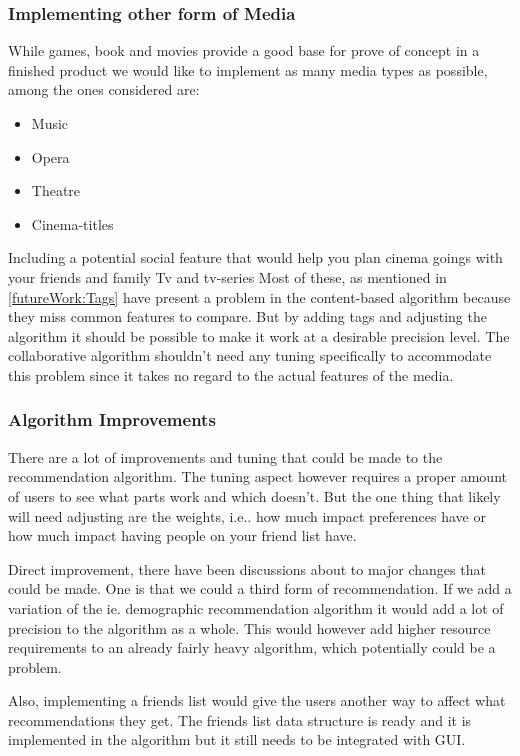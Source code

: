 \subsubsection{Implementing other form of Media}
While games, book and movies provide a good base for prove of concept in a finished product we would like to implement as many media types as possible, among the ones considered are:
\begin{itemize}
\item Music
\item Opera
\item Theatre
\item Cinema-titles
\end{itemize}

Including a potential social feature that would help you plan cinema goings with your friends and family
Tv and tv-series
Most of these, as mentioned in \ref{futureWork:Tags} have present a problem in the content-based algorithm because they miss common features to compare. But by adding tags and adjusting the algorithm it should be possible to make it work at a desirable precision level. The collaborative algorithm shouldn't need any tuning specifically to accommodate this problem since it takes no regard to the actual features of the media.

\subsubsection{Algorithm Improvements}
There are a lot of improvements and tuning that could be made to the recommendation algorithm. The tuning aspect however requires a proper amount of users to see what parts work and which doesn't. But the one thing that likely will need adjusting are the weights, i.e.. how much impact preferences have or how much impact having people on your friend list have.

Direct improvement, there have been discussions about to major changes that could be made. One is that we could a third form of recommendation. If we add a variation of the ie. demographic recommendation algorithm it would add a lot of precision to the algorithm as a whole. This would however add higher resource requirements to an already fairly heavy algorithm, which potentially could be a problem.

Also, implementing a friends list would give the users another way to affect what recommendations they get. The friends list data structure is ready and it is implemented in the algorithm but it still needs to be integrated with GUI.

